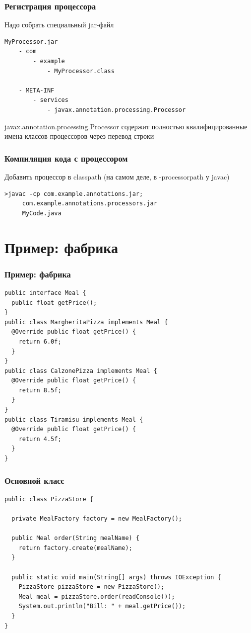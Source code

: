 \documentclass[xetex,mathserif,serif]{beamer}
\begin{document}
	\begin{frame}[fragile]
		\frametitle{Регистрация процессора}
		Надо собрать специальный jar-файл
		\begin{verbatim}
MyProcessor.jar
    - com
        - example
            - MyProcessor.class

    - META-INF
        - services
            - javax.annotation.processing.Processor
		\end{verbatim}
	javax.annotation.processing.Processor содержит полностью квалифицированные имена классов-процессоров через перевод строки
\end{frame}

	\begin{frame}[fragile]
		\frametitle{Компиляция кода с процессором}
		Добавить процессор в classpath (на самом деле, в -processorpath у javac)
		\vspace{1cm}
		\begin{verbatim}
>javac -cp com.example.annotations.jar;
     com.example.annotations.processors.jar
     MyCode.java
		\end{verbatim}
\end{frame}

	\section{Пример: фабрика}

		\begin{frame}[fragile]
		\frametitle{Пример: фабрика}
		\begin{footnotesize}
			\begin{verbatim}
public interface Meal {
  public float getPrice();
}
public class MargheritaPizza implements Meal {
  @Override public float getPrice() {
    return 6.0f;
  }
}
public class CalzonePizza implements Meal {
  @Override public float getPrice() {
    return 8.5f;
  }
}
public class Tiramisu implements Meal {
  @Override public float getPrice() {
    return 4.5f;
  }
}
			\end{verbatim}
		\end{footnotesize}
\end{frame}

	\begin{frame}[fragile]
		\frametitle{Основной класс}
		\begin{small}
			\begin{verbatim}
public class PizzaStore {

  private MealFactory factory = new MealFactory();

  public Meal order(String mealName) {
    return factory.create(mealName);
  }

  public static void main(String[] args) throws IOException {
    PizzaStore pizzaStore = new PizzaStore();
    Meal meal = pizzaStore.order(readConsole());
    System.out.println("Bill: " + meal.getPrice());
  }
}
			\end{verbatim}
		\end{small}
\end{frame}
\end{document}
